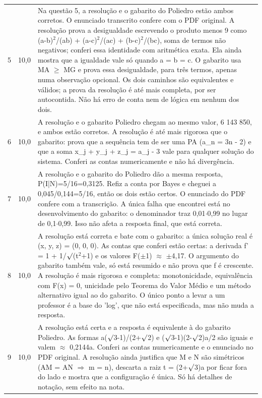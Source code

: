 \documentclass{article}%
\begin{document}
\begin{longtable}{@{}c c p{}@{}}
5 & 10,0 & Na questão 5, a resolução e o gabarito do Poliedro estão ambos corretos. O enunciado transcrito confere com o PDF original. A resolução prova a desigualdade escrevendo o produto menos 9 como (a-b)$^2$/(ab) + (a-c)$^2$/(ac) + (b-c)$^2$/(bc), soma de termos não negativos; conferi essa identidade com aritmética exata. Ela ainda mostra que a igualdade vale só quando a = b = c. O gabarito usa MA $\geq$ MG e prova essa desigualdade, para três termos, apenas numa observação opcional. Os dois caminhos são equivalentes e válidos; a prova da resolução é até mais completa, por ser autocontida. Não há erro de conta nem de lógica em nenhum dos dois. \\
6 & 10,0 & A resolução e o gabarito Poliedro chegam ao mesmo valor, 6 143 850, e ambos estão corretos. A resolução é até mais rigorosa que o gabarito: prova que a sequência tem de ser uma PA (a\_n = 3n - 2) e que a soma x\_j + y\_j + z\_j = a\_j - 3 vale para qualquer solução do sistema. Conferi as contas numericamente e não há divergência. \\
7 & 10,0 & A resolução e o gabarito do Poliedro dão a mesma resposta, P(I|N)=5/16=0,3125. Refiz a conta por Bayes e cheguei a 0,045/0,144=5/16, então os dois estão certos. O enunciado do PDF confere com a transcrição. A única falha que encontrei está no desenvolvimento do gabarito: o denominador traz 0,01$\cdot$0,99 no lugar de 0,1$\cdot$0,99. Isso não afeta a resposta final, que está correta. \\
8 & 10,0 & A resolução está correta e bate com o gabarito: a única solução real é (x, y, z) = (0, 0, 0). As contas que conferi estão certas: a derivada f' = 1 + 1/$\surd$(t$^2$+1) e os valores F($\pm$1) $\approx$ $\pm$4,17. O argumento do gabarito também vale, só está resumido e não prova que f é crescente. A resolução é mais rigorosa e completa: monotonicidade, equivalência com F(x) = 0, unicidade pelo Teorema do Valor Médio e um método alternativo igual ao do gabarito. O único ponto a levar a um professor é a base do 'log', que não está especificada, mas não muda a resposta. \\
9 & 10,0 & A resolução está certa e a resposta é equivalente à do gabarito Poliedro. As formas a($\surd$3-1)/(2+$\surd$2) e ($\surd$3-1)(2-$\surd$2)a/2 são iguais e valem $\approx$ 0,2144a. Conferi as contas numericamente e o enunciado no PDF original. A resolução ainda justifica que M e N são simétricos (AM = AN $\Rightarrow$ m = n), descarta a raiz t = (2+$\surd$3)a por ficar fora do lado e mostra que a configuração é única. Só há detalhes de notação, sem efeito na nota. \\

\end{longtable}
\end{document}
